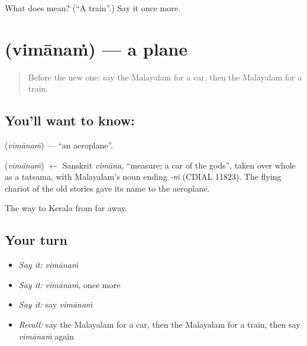 \begin{tcolorbox}[breakable,colback=teal!4,colframe=teal!35!black,title={Before you move on}]
What does  mean? (\textquotedblleft{}A train\textquotedblright{}.) Say it once more.
\end{tcolorbox}
\section[\texorpdfstring{\ml{വിമാനം} (vimānaṁ)}{വിമാനം (vimānaṁ)}]{ (vimānaṁ) — a plane}

\label{lesson:ML-C137-plane}



\begin{quote}
Before the new one: say the Malayalam for a car, then the Malayalam for a train.
\end{quote}

\subsection*{You'll want to know: }
\textbf{} (\emph{vimānaṁ}) — \textquotedblleft{}an aeroplane\textquotedblright{}.

\begin{cousinweb}
\textbf{} (\emph{vimānaṁ}) $\leftarrow$ Sanskrit \emph{vimāna}, \textquotedblleft{}measure; a car of the gods\textquotedblright{}, taken over whole as a tatsama, with Malayalam's noun ending \emph{-ṁ} (CDIAL 11823). The flying chariot of the old stories gave its name to the aeroplane.
\end{cousinweb}

\begin{grammarlens}[title={What you've built}]
The way to Kerala from far away.
\end{grammarlens}

\subsection*{Your turn}
\begin{itemize}
\raggedright
  \item \emph{Say it:} \emph{vimānaṁ}
  \item \emph{Say it:} \emph{vimānaṁ}, once more
  \item \emph{Say it:} say \emph{vimānaṁ}
  \item \emph{Recall:} say the Malayalam for a car, then the Malayalam for a train, then say \emph{vimānaṁ} again
\end{itemize}

